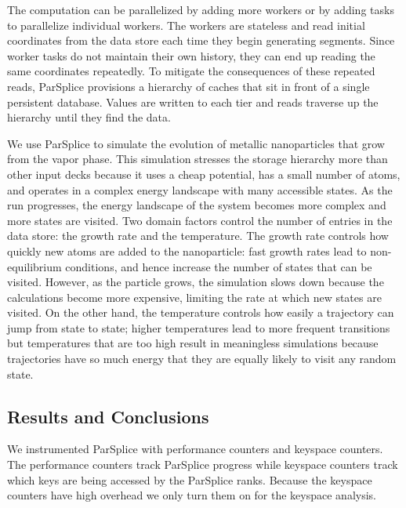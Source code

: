 The computation can be parallelized by adding more workers or by adding tasks
to parallelize individual workers.  The workers are stateless and read initial
coordinates from the data store each time they begin generating segments. Since
worker tasks do not maintain their own history, they can end up reading the
same coordinates repeatedly. To mitigate the consequences of these repeated
reads, ParSplice provisions a hierarchy of caches that sit in front of a single
persistent database.  Values are written to each tier and reads traverse up the
hierarchy until they find the data.  

We use ParSplice to simulate the evolution of metallic nanoparticles that grow
from the vapor phase.  This simulation stresses the storage hierarchy more than
other input decks because it uses a cheap potential, has a small number of
atoms, and operates in a complex energy landscape with many accessible states.
As the run progresses, the energy landscape of the system becomes more complex
and more states are visited.  Two domain factors control the number of entries
in the data store: the growth rate and the temperature. The growth rate
controls how quickly new atoms are added to the nanoparticle: fast growth rates
lead to non-equilibrium conditions, and hence increase the number of states
that can be visited.  However, as the particle grows, the simulation slows down
because the calculations become more expensive, limiting the rate at which new
states are visited.  On the other hand, the temperature controls how easily a
trajectory can jump from state to state; higher temperatures lead to more
frequent transitions but temperatures that are too high result in meaningless
simulations because trajectories have so much energy that they are equally
likely to visit any random state. 

\subsection{Results and Conclusions}
\label{sec:parsplice-keyspace-analysis}

We instrumented ParSplice with performance counters and keyspace counters.  The
performance counters track ParSplice progress while keyspace counters track
which keys are being accessed by the ParSplice ranks. Because the keyspace
counters have high overhead we only turn them on for the keyspace analysis.

